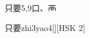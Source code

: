 \begin{entry}{只要}{5,9}{⼝、⾑}
  \begin{phonetics}{只要}{zhi3yao4}[][HSK 2]
  \end{phonetics}
\end{entry}
